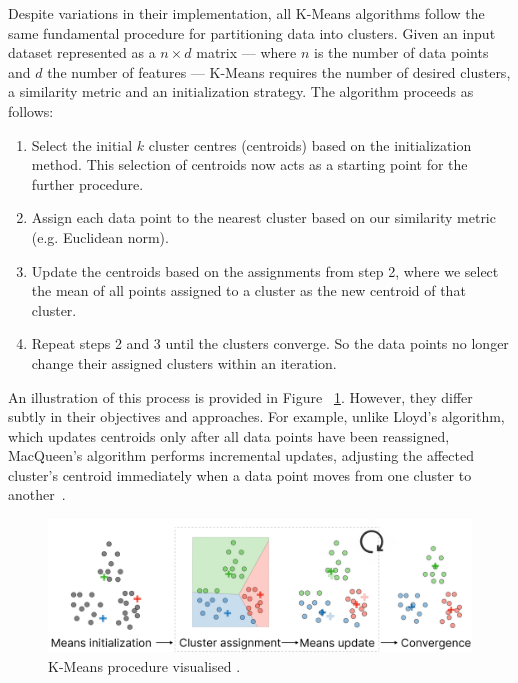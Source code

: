 \documentclass[10pt,twocolumn,letterpaper]{article}
\begin{document}
Despite variations in their implementation, all K-Means algorithms follow the
same fundamental procedure for partitioning data into clusters. Given an input
dataset represented as a $n \times d$ matrix — where $n$ is the number of data
points and $d$ the number of features — K-Means requires the number of desired
clusters, a similarity metric and an initialization strategy. The algorithm
proceeds as follows:
\begin{enumerate}
    \item Select the initial $k$ cluster centres (centroids) based on the initialization
          method. This selection of centroids now acts as a starting point for the
          further procedure.
    \item Assign each data point to the nearest cluster based on our similarity metric
          (e.g. Euclidean norm).
    \item Update the centroids based on the assignments from step 2, where we select the
          mean of all points assigned to a cluster as the new centroid of that cluster.
    \item Repeat steps 2 and 3 until the clusters converge. So the data points no longer
          change their assigned clusters within an iteration.
\end{enumerate}
An illustration of this process is provided in Figure
~\ref{fig:kmeans-procedure}. However, they differ subtly in their objectives
and approaches. For example, unlike Lloyd's algorithm, which updates centroids
only after all data points have been reassigned, MacQueen's algorithm performs
incremental updates, adjusting the affected cluster’s centroid immediately when
a data point moves from one cluster to another~\cite{Morissette2013}.

\begin{figure}[t]
    \begin{center}
        \includegraphics[width=0.9\linewidth]{figures/K-Means procedure}
    \end{center}
    \caption{K-Means procedure visualised \cite{Amidi2018}.}
    \label{fig:kmeans-procedure}
\end{figure}
\end{document}
